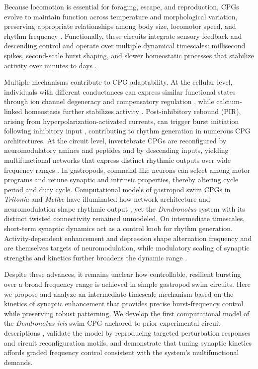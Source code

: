 \documentclass[nofootinbib,aip,amsmath,amssymb,preprint,twocolumn,floatfix,10pt]{revtex4-2}
\begin{document}
Because locomotion is essential for foraging, escape, and reproduction, CPGs evolve to maintain function across temperature and morphological variation, preserving appropriate relationships among body size, locomotor speed, and rhythm frequency \cite{Marder2023}. Functionally, these circuits integrate sensory feedback and descending control and operate over multiple dynamical timescales: millisecond spikes, second-scale burst shaping, and slower homeostatic processes that stabilize activity over minutes to days \cite{MarderCalabrese1996}.

Multiple mechanisms contribute to CPG adaptability. At the cellular level, individuals with different conductances can express similar functional states through ion channel degeneracy and compensatory regulation \cite{Marder2011, OLeary2014}, while calcium-linked homeostasis further stabilizes activity \cite{Franci2020}. Post-inhibitory rebound (PIR), arising from hyperpolarization-activated currents, can trigger burst initiation following inhibitory input \cite{Perkel-Mulloney-74}, contributing to rhythm generation in numerous CPG architectures. At the circuit level, invertebrate CPGs are reconfigured by neuromodulatory amines and peptides and by descending inputs, yielding multifunctional networks that express distinct rhythmic outputs over wide frequency ranges \cite{MarderBucher2001, NusbaumBeenhakker2002, JingWeiss2005, BriggmanKristan2008}. In gastropods, command-like neurons can select among motor programs and retune synaptic and intrinsic properties, thereby altering cycle period and duty cycle. Computational models of gastropod swim CPGs in \textit{Tritonia} and \textit{Melibe} have illuminated how network architecture and neuromodulation shape rhythmic output \cite{NW02, TW05, SNLK11}, yet the \textit{Dendronotus} system with its distinct twisted connectivity remained unmodeled. On intermediate timescales, short-term synaptic dynamics act as a control knob for rhythm generation. Activity-dependent enhancement and depression shape alternation frequency and are themselves targets of neuromodulation, while modulatory scaling of synaptic strengths and kinetics further broadens the dynamic range \cite{zucker2002short, jackman2017mechanisms, Manor1997, NadimBucher2014, NeherBrose2018}.

Despite these advances, it remains unclear how controllable, resilient bursting over a broad frequency range is achieved in simple gastropod swim circuits. Here we propose and analyze an intermediate-timescale mechanism based on the kinetics of synaptic enhancement that provides precise burst-frequency control while preserving robust patterning. We develop the first computational model of the \textit{Dendronotus iris} swim CPG anchored to prior experimental circuit descriptions \cite{SakuraiKatz2016, sakurai2019command}, validate the model by reproducing targeted perturbation responses and circuit reconfiguration motifs, and demonstrate that tuning synaptic kinetics affords graded frequency control consistent with the system's multifunctional demands.
\end{document}

